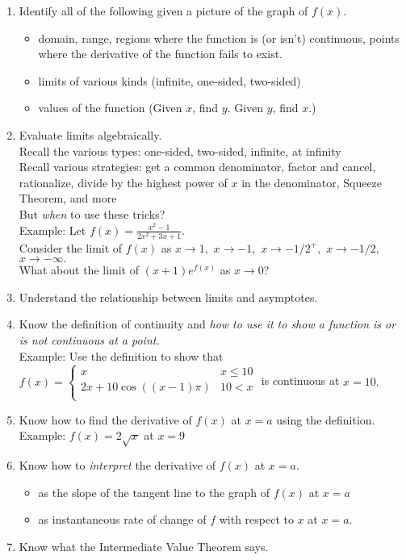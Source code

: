 \documentclass[12pt]{article}
\begin{document}
\begin{enumerate}
\item Identify all of the following given a picture of the graph of $f(x).$
	\begin{itemize}
	\item domain, range, regions where the function is (or isn't) continuous, points where the derivative of the function fails to exist.
	\item limits of various kinds (infinite, one-sided, two-sided)
	\item values of the function (Given $x$, find $y$. Given $y$, find $x$.)
	\end{itemize}
\item Evaluate limits algebraically. \\
Recall the various types: one-sided, two-sided, infinite, at infinity\\
Recall various strategies: get a common denominator, factor and cancel, rationalize, divide by the highest power of $x$ in the denominator, Squeeze Theorem, and more\\
But \emph{when} to use these tricks?\\

Example: Let $f(x)=\frac{x^2-1}{2x^2+3x+1}.$\\
Consider the limit of $f(x)$ as $x \to 1,$ $x \to -1,$ $x \to -1/2^+,$ $x \to -1/2,$$x \to -\infty.$\\
What about the limit of $(x+1)e^{f(x)}$ as $x \to 0$?\\

\item Understand the relationship between limits and asymptotes.
\item Know the definition of continuity and \emph{how to use it to show a function is or is not continuous at a point.}\\

Example: Use the definition to show that  $f(x)=\begin{cases} x & x \leq 10 \\ 2x +10 \cos((x-1)\pi) & 10<x \\
\end{cases}$ \quad is continuous at $x=10.$

\item Know how to find the derivative of $f(x)$ at $x=a$ using the definition.\\
Example: $f(x)=2\sqrt{x}$ at $x=9$\\
\item Know how to \emph{interpret} the derivative of $f(x)$ at $x=a.$ 
	\begin{itemize}
	\item as the slope of the tangent line to the graph of $f(x)$ at $x=a$
	\item as instantaneous rate of change of $f$ with respect to $x$ at $x=a.$
	\end{itemize}
\item Know what the Intermediate Value Theorem says.
\end{enumerate}
\end{document}
